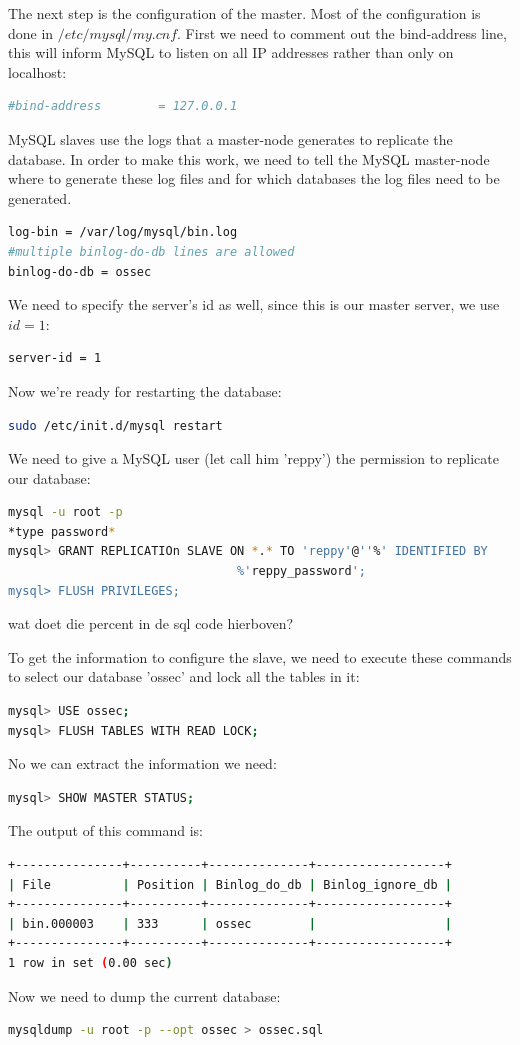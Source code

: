 \documentclass[12pt]{report}
\begin{document}
The next step is the configuration of the master. Most of the
configuration is done in $/etc/mysql/my.cnf$.
First we need to comment out the bind-address line, this will inform MySQL
to listen on all IP addresses rather than only on localhost:
\begin{lstlisting}[language=bash]
#bind-address        = 127.0.0.1
\end{lstlisting}
MySQL slaves use the logs that a master-node generates to replicate
the database. In order to make this work, we need to tell the MySQL
master-node where to
generate these log files and for which databases the log files need to
be generated. 
\begin{lstlisting}[language=bash]
log-bin = /var/log/mysql/bin.log
#multiple binlog-do-db lines are allowed
binlog-do-db = ossec
\end{lstlisting}
We need to specify the server's id as well, since this is our master
server, we use $id=1$:
\begin{lstlisting}[language=bash]
server-id = 1
\end{lstlisting}
Now we're ready for restarting the database:
\begin{lstlisting}[language=bash]
sudo /etc/init.d/mysql restart
\end{lstlisting}
We need to give a MySQL user (let call him 'reppy') the permission to replicate our
database:
\begin{lstlisting}[language=bash]
mysql -u root -p
*type password*
mysql> GRANT REPLICATIOn SLAVE ON *.* TO 'reppy'@''%' IDENTIFIED BY
                                %'reppy_password';
mysql> FLUSH PRIVILEGES;
\end{lstlisting}
wat doet die percent in de sql code hierboven?

To get the information to configure the slave, we need to execute these
commands to select our database 'ossec' and lock all the tables in it:
\begin{lstlisting}[language=bash]
mysql> USE ossec;
mysql> FLUSH TABLES WITH READ LOCK;
\end{lstlisting}
No we can extract the information we need:
\begin{lstlisting}[language=bash]
mysql> SHOW MASTER STATUS;
\end{lstlisting}
The output of this command is:
\begin{lstlisting}[language=bash]
+---------------+----------+--------------+------------------+
| File          | Position | Binlog_do_db | Binlog_ignore_db |
+---------------+----------+--------------+------------------+
| bin.000003    | 333      | ossec        |                  |
+---------------+----------+--------------+------------------+
1 row in set (0.00 sec)
\end{lstlisting}
Now we need to dump the current database:
\begin{lstlisting}[language=bash]
mysqldump -u root -p --opt ossec > ossec.sql
\end{lstlisting}
\end{document}
